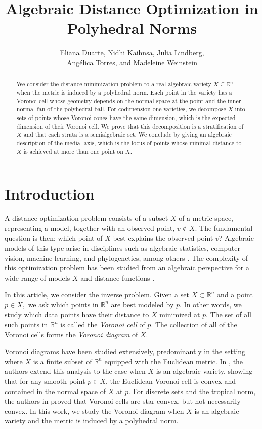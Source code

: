 \documentclass{article}
\title{Algebraic Distance Optimization in Polyhedral Norms}
\author{Eliana Duarte, Nidhi Kaihnsa, Julia Lindberg,\\ Angélica Torres, and Madeleine Weinstein}
\numberwithin{theorem}{section}
\theoremstyle{definition}
\theoremstyle{example_contd}
\newcommand{\RR}{\mathbb{R}}
\begin{document}
	\maketitle
    \begin{abstract}
        We consider the distance minimization problem to a real algebraic variety $X \subseteq \RR^n$ when
        the metric is induced by a polyhedral norm. Each point in the variety has a Voronoi cell whose geometry
        depends on the normal space at the point and the inner normal fan of the polyhedral ball. 
        For codimension-one varieties, we decompose $X$ into sets of  points whose Voronoi cones have the same dimension, which is the expected dimension of their Voronoi cell. 
        We prove that this decomposition is a stratification of $X$ and 
        that each strata is a semialgebraic set.
        We conclude by giving an algebraic description of the medial axis, which is the locus of points whose minimal distance to $X$ is achieved at more than one point on $X$.
    
     \end{abstract}
     
     \section{Introduction}
A distance optimization problem consists of a subset $X$ of a metric space, representing a model, together with an observed point, $v \not\in X$.
     The fundamental question is then: which point of $X$ best explains the observed point $v$? Algebraic models of this type arise in disciplines such as algebraic statistics, computer vision, machine learning, and phylogenetics, among others \cite{breiding2024metric}. The complexity of this optimization problem has been studied from an algebraic perspective for a wide range of models $X$ and distance functions \cite{Breiding2022,breiding2024metric,Draisma2016,Maxim2020}. 

     In this article, we consider the inverse problem. Given a set $X\subset \RR^n$ and a point $p\in X,$ we ask which points in $\RR^n$ are best modeled by $p$. 
     In other words, we study which data points have their distance to $X$ minimized at $p$.
     The set of all such points in $\RR^n$ is called the \textit{Voronoi cell} of $p$. The collection of all of the Voronoi cells forms the \textit{Voronoi diagram} of $X$.

     Voronoi diagrams have been studied extensively, predominantly in the setting where $X$ is a finite subset of $\RR^n$ equipped with the Euclidean metric. In \cite{CIFUENTES2022351}, the authors extend this analysis to the case when $X$ is an algebraic variety, showing that for any smooth point $p\in X$, the Euclidean Voronoi cell is convex and contained in the normal space of $X$ at $p.$ 
        For discrete sets and the tropical norm, the authors in \cite[Theorem 6]{Criado} proved that Voronoi cells are star-convex, but not necessarily convex. 
     In this work, we study the Voronoi diagram when $X$ is an algebraic variety and the metric is induced by a polyhedral norm. 
\end{document}
